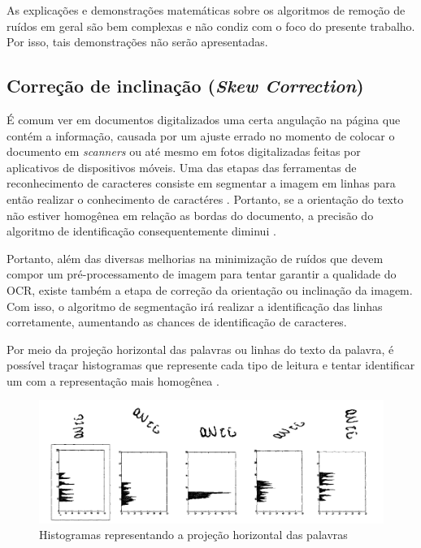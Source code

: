 As explicações e demonstrações matemáticas sobre os algoritmos de remoção de ruídos em geral são bem complexas e não condiz com o foco do presente trabalho. Por isso, tais demonstrações não serão apresentadas.

\subsection{Correção de inclinação (\textit{Skew Correction})}

É comum ver em documentos digitalizados uma certa angulação na página que contém a informação, causada por um ajuste errado no momento de colocar o documento em \textit{scanners} ou até mesmo em fotos digitalizadas feitas por aplicativos de dispositivos móveis. Uma das etapas das ferramentas de reconhecimento de caracteres consiste em segmentar a imagem em linhas para então realizar o conhecimento de caractéres \cite{ocr-survey}. Portanto, se a orientação do texto não estiver homogênea em relação as bordas do documento, a precisão do algoritmo de identificação consequentemente diminui \cite{metrics-for-ocr-performance}.

Portanto, além das diversas melhorias na minimização de ruídos que devem compor um pré-processamento de imagem para tentar garantir a qualidade do OCR, existe também a etapa de correção da orientação ou inclinação da imagem. Com isso, o algoritmo de segmentação irá realizar a identificação das linhas corretamente, aumentando as chances de identificação de caracteres.

Por meio da projeção horizontal das palavras ou linhas do texto da palavra, é possível traçar histogramas que represente cada tipo de leitura e tentar identificar um com a representação mais homogênea \cite{skew-correction-and-slant-removal}.

\begin{figure}[h]
  \centering
  \caption{Histogramas representando a projeção horizontal das palavras}
  \includegraphics[scale=0.45]{figuras/skew-correction.png}
\end{figure}

